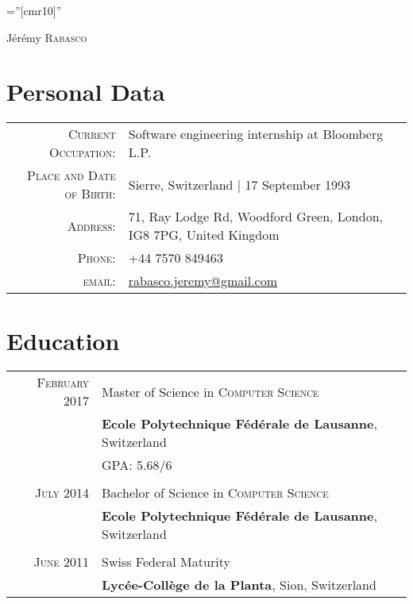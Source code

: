 \documentclass[a4paper,10pt]{article}
\begin{document}
\pagestyle{empty}
\font\fb=''[cmr10]''

\par{\centering
		{\Huge Jérémy \textsc{Rabasco}
	}\bigskip\par}

\section{Personal Data}

\begin{tabular}{rl}
	\textsc{Current Occupation:} & Software engineering internship at Bloomberg L.P.\\
	\textsc{Place and Date of Birth:} & Sierre, Switzerland | 17 September 1993 \\
	\textsc{Address:}   & 71, Ray Lodge Rd, Woodford Green, London, IG8 7PG, United Kingdom \\
	\textsc{Phone:}     & +44 7570 849463\\
	\textsc{email:}     & \href{mailto:rabasco.jeremy@gmail.com}{rabasco.jeremy@gmail.com}
\end{tabular}

\section{Education}
\begin{tabular}{rl}	
	\textsc{February 2017} & Master of Science in \textsc{Computer Science} \\
	& \textbf{Ecole Polytechnique Fédérale de Lausanne}, Switzerland\\
	&\normalsize \textsc{GPA}: 5.68/6\\\\
	\textsc{July} 2014 & Bachelor of Science in \textsc{Computer Science}\\
	& \textbf{Ecole Polytechnique Fédérale de Lausanne}, Switzerland\\\\
	\textsc{June 2011} & Swiss Federal Maturity\\
	&\textbf{Lycée-Collège de la Planta}, Sion, Switzerland
\end{tabular}

\end{document}
